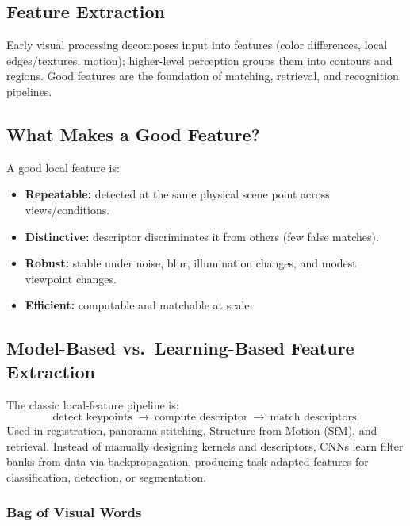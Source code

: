 \documentclass[11pt, oneside]{book}
\begin{document}
\begin{thmbox}[title={Reprojection Error Minimization}]
\begin{defbox}[title={Correlation and Convolution}]
\begin{defbox}[title={ReLU and Pooling}]
\chapter{Feature Extraction}

Early visual processing decomposes input into features (color differences, local edges/textures, motion);
higher-level perception groups them into contours and regions. Good features are the foundation of
matching, retrieval, and recognition pipelines.

\section{What Makes a Good Feature?}

\begin{defbox}[title={Properties of Good Local Features}]
A good local feature is:
\begin{itemize}
  \item \textbf{Repeatable:} detected at the same physical scene point across views/conditions.
  \item \textbf{Distinctive:} descriptor discriminates it from others (few false matches).
  \item \textbf{Robust:} stable under noise, blur, illumination changes, and modest viewpoint changes.
  \item \textbf{Efficient:} computable and matchable at scale.
\end{itemize}
\end{defbox}

\section{Model-Based vs.\ Learning-Based Feature Extraction}

The classic local-feature pipeline is:
\[
\text{detect keypoints} \ \rightarrow\ \text{compute descriptor}\ \rightarrow\ \text{match descriptors}.
\]
Used in registration, panorama stitching, Structure from Motion (SfM), and retrieval.
Instead of manually designing kernels and descriptors, CNNs learn filter banks from data via backpropagation,
producing task-adapted features for classification, detection, or segmentation.

\subsection{Bag of Visual Words}


\end{defbox}
\end{defbox}
\end{thmbox}
\end{document}
